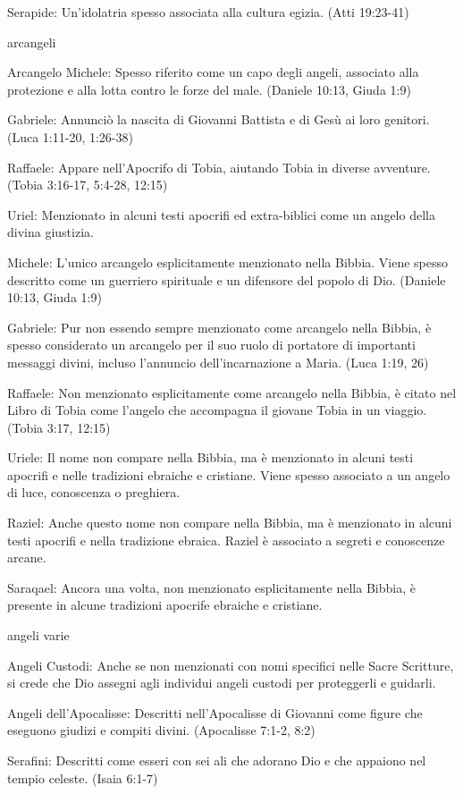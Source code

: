 \documentclass[12pt,a4paper,twoside,openany]{book}
\begin{document}
Serapide: Un'idolatria spesso associata alla cultura egizia. (Atti 19:23-41)


arcangeli


Arcangelo Michele: Spesso riferito come un capo degli angeli, associato alla protezione e alla lotta contro le forze del male. (Daniele 10:13, Giuda 1:9)

Gabriele: Annunciò la nascita di Giovanni Battista e di Gesù ai loro genitori. (Luca 1:11-20, 1:26-38)

Raffaele: Appare nell'Apocrifo di Tobia, aiutando Tobia in diverse avventure. (Tobia 3:16-17, 5:4-28, 12:15)

Uriel: Menzionato in alcuni testi apocrifi ed extra-biblici come un angelo della divina giustizia.

Michele: L'unico arcangelo esplicitamente menzionato nella Bibbia. Viene spesso descritto come un guerriero spirituale e un difensore del popolo di Dio. (Daniele 10:13, Giuda 1:9)

Gabriele: Pur non essendo sempre menzionato come arcangelo nella Bibbia, è spesso considerato un arcangelo per il suo ruolo di portatore di importanti messaggi divini, incluso l'annuncio dell'incarnazione a Maria. (Luca 1:19, 26)

Raffaele: Non menzionato esplicitamente come arcangelo nella Bibbia, è citato nel Libro di Tobia come l'angelo che accompagna il giovane Tobia in un viaggio. (Tobia 3:17, 12:15)

Uriele: Il nome non compare nella Bibbia, ma è menzionato in alcuni testi apocrifi e nelle tradizioni ebraiche e cristiane. Viene spesso associato a un angelo di luce, conoscenza o preghiera.

Raziel: Anche questo nome non compare nella Bibbia, ma è menzionato in alcuni testi apocrifi e nella tradizione ebraica. Raziel è associato a segreti e conoscenze arcane.

Saraqael: Ancora una volta, non menzionato esplicitamente nella Bibbia, è presente in alcune tradizioni apocrife ebraiche e cristiane.

angeli varie

Angeli Custodi: Anche se non menzionati con nomi specifici nelle Sacre Scritture, si crede che Dio assegni agli individui angeli custodi per proteggerli e guidarli.

Angeli dell'Apocalisse: Descritti nell'Apocalisse di Giovanni come figure che eseguono giudizi e compiti divini. (Apocalisse 7:1-2, 8:2)

Serafini: Descritti come esseri con sei ali che adorano Dio e che appaiono nel tempio celeste. (Isaia 6:1-7)
\end{document}
